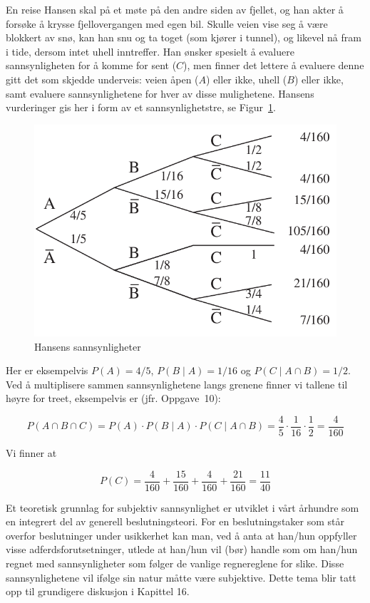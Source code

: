 \begin{eksempel}{En reise}
Hansen skal på et møte på den andre siden av fjellet, og han
akter å forsøke å krysse fjellovergangen med egen bil. Skulle
veien vise seg å være blokkert av snø, kan han snu og ta toget
(som kjører i tunnel), og likevel nå fram i tide, dersom intet
uhell inntreffer. Han ønsker spesielt å evaluere sannsynligheten
for å komme for sent ($C$), men finner det lettere å evaluere denne
gitt det som skjedde underveis: veien åpen ($A$) eller ikke, uhell
($B$) eller ikke, samt evaluere sannsynlighetene for hver av disse
mulighetene. Hansens vurderinger gis her i form av et
sannsynlighetstre, se Figur~\ref{fig:hansens_sannsynligheter}.

\begin{figure}[ht]
\centering \centering
\includegraphics[scale=0.8]{figurer/fig4_3.pdf} 
\caption{Hansens sannsynligheter}
	\label{fig:hansens_sannsynligheter}
\end{figure}
Her er eksempelvis $P(A)=4/5$, $P(B\mid A)=1/16$ og $P(C\mid A \cap B)=1/2$.
 Ved å multiplisere sammen sannsynlighetene langs grenene
finner vi tallene til høyre for treet, eksempelvis er (jfr.
Oppgave~10):

\[ P(A\cap B\cap C)=P(A)\cdot P(B\mid A)\cdot P(C\mid A\cap B)
            =\frac{4}{5} \cdot \frac{1}{16} \cdot \frac{1}{2} = \frac{4}{160}\]

\noindent Vi finner at

\[ P(C) = \frac{4}{160} + \frac{15}{160} + \frac{4}{160}+\frac{21}{160} = \frac{11}{40} \]
\end{eksempel}
Et teoretisk grunnlag for subjektiv sannsynlighet er utviklet i
vårt århundre som en integrert del av generell beslutningsteori.
For en beslutningstaker som står overfor beslutninger under
usikkerhet kan man, ved å anta at han/hun oppfyller visse
adferdsforutsetninger, utlede at han/hun vil (bør) handle som om han/hun regnet
med sannsynligheter som følger de vanlige regnereglene for slike.
Disse sannsynlighetene vil ifølge sin natur måtte være
subjektive. Dette tema blir tatt opp til grundigere diskusjon i
Kapittel 16. \\[0.2cm]
          

